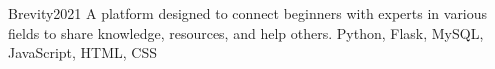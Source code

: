 \begin{projects}
	\project
	{Brevity}{2021}
	{}
	{A platform designed to connect beginners with experts in various fields to share knowledge, resources, and help others.}
	{Python, Flask, MySQL, JavaScript, HTML, CSS}

\end{projects}